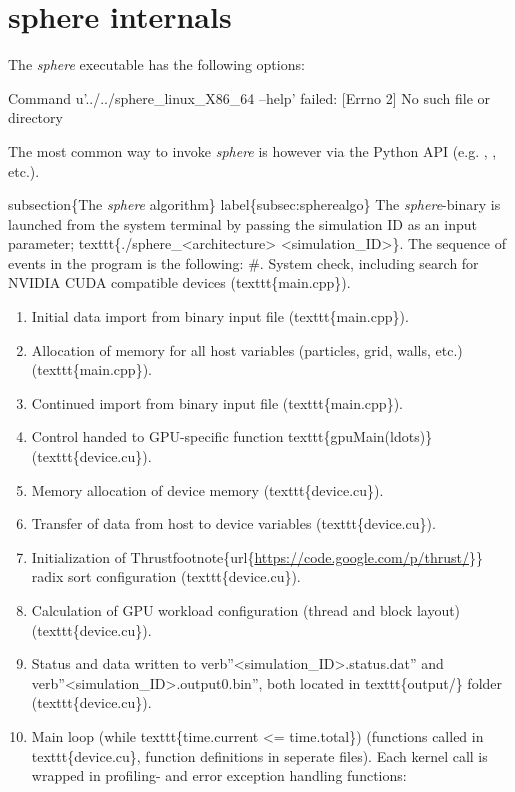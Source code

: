 \documentclass[letterpaper,10pt,english]{sphinxmanual}
\begin{document}
\chapter{sphere internals}
\label{sphere_internals:sphere-internals}\label{sphere_internals::doc}
The \emph{sphere} executable has the following options:

Command u'../../sphere\_linux\_X86\_64 --help' failed: {[}Errno 2{]} No such file or directory


The most common way to invoke \emph{sphere} is however via the Python API (e.g. {\hyperref[python_api:sphere.run]{}}, {\hyperref[python_api:sphere.render]{}}, etc.).

subsection\{The \emph{sphere} algorithm\}
label\{subsec:spherealgo\}
The \emph{sphere}-binary is launched from the system terminal by passing the simulation ID as an input parameter; texttt\{./sphere\_\textless{}architecture\textgreater{} \textless{}simulation\_ID\textgreater{}\}. The sequence of events in the program is the following:
\#. System check, including search for NVIDIA CUDA compatible devices (texttt\{main.cpp\}).
\begin{enumerate}
\item {} 
Initial data import from binary input file (texttt\{main.cpp\}).

\item {} 
Allocation of memory for all host variables (particles, grid, walls, etc.) (texttt\{main.cpp\}).

\item {} 
Continued import from binary input file (texttt\{main.cpp\}).

\item {} 
Control handed to GPU-specific function texttt\{gpuMain(ldots)\} (texttt\{device.cu\}).

\item {} 
Memory allocation of device memory (texttt\{device.cu\}).

\item {} 
Transfer of data from host to device variables (texttt\{device.cu\}).

\item {} 
Initialization of Thrustfootnote\{url\{\href{https://code.google.com/p/thrust/}{https://code.google.com/p/thrust/}\}\} radix sort configuration (texttt\{device.cu\}).

\item {} 
Calculation of GPU workload configuration (thread and block layout) (texttt\{device.cu\}).

\item {} 
Status and data written to verb''\textless{}simulation\_ID\textgreater{}.status.dat'' and verb''\textless{}simulation\_ID\textgreater{}.output0.bin'', both located in texttt\{output/\} folder (texttt\{device.cu\}).

\item {} 
Main loop (while texttt\{time.current \textless{}= time.total\}) (functions called in texttt\{device.cu\}, function definitions in seperate files). Each kernel call is wrapped in profiling- and error exception handling functions:

\end{enumerate}
\end{document}
